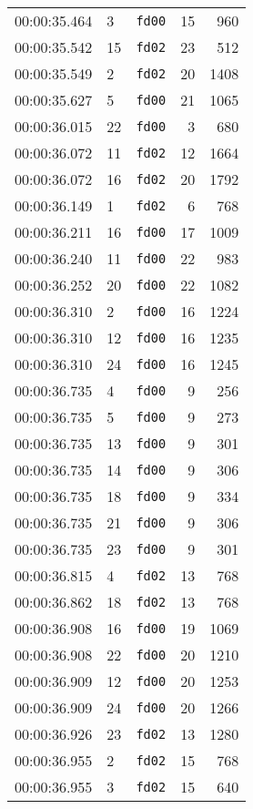 \documentclass{article}
\begin{document}
\begin{longtable}{lllrr}
00:00:35.464 & 3 & \texttt{fd00} & 15 & 960 \\
00:00:35.542 & 15 & \texttt{fd02} & 23 & 512 \\
00:00:35.549 & 2 & \texttt{fd02} & 20 & 1408 \\
00:00:35.627 & 5 & \texttt{fd00} & 21 & 1065 \\
00:00:36.015 & 22 & \texttt{fd00} & 3 & 680 \\
00:00:36.072 & 11 & \texttt{fd02} & 12 & 1664 \\
00:00:36.072 & 16 & \texttt{fd02} & 20 & 1792 \\
00:00:36.149 & 1 & \texttt{fd02} & 6 & 768 \\
00:00:36.211 & 16 & \texttt{fd00} & 17 & 1009 \\
00:00:36.240 & 11 & \texttt{fd00} & 22 & 983 \\
00:00:36.252 & 20 & \texttt{fd00} & 22 & 1082 \\
00:00:36.310 & 2 & \texttt{fd00} & 16 & 1224 \\
00:00:36.310 & 12 & \texttt{fd00} & 16 & 1235 \\
00:00:36.310 & 24 & \texttt{fd00} & 16 & 1245 \\
00:00:36.735 & 4 & \texttt{fd00} & 9 & 256 \\
00:00:36.735 & 5 & \texttt{fd00} & 9 & 273 \\
00:00:36.735 & 13 & \texttt{fd00} & 9 & 301 \\
00:00:36.735 & 14 & \texttt{fd00} & 9 & 306 \\
00:00:36.735 & 18 & \texttt{fd00} & 9 & 334 \\
00:00:36.735 & 21 & \texttt{fd00} & 9 & 306 \\
00:00:36.735 & 23 & \texttt{fd00} & 9 & 301 \\
00:00:36.815 & 4 & \texttt{fd02} & 13 & 768 \\
00:00:36.862 & 18 & \texttt{fd02} & 13 & 768 \\
00:00:36.908 & 16 & \texttt{fd00} & 19 & 1069 \\
00:00:36.908 & 22 & \texttt{fd00} & 20 & 1210 \\
00:00:36.909 & 12 & \texttt{fd00} & 20 & 1253 \\
00:00:36.909 & 24 & \texttt{fd00} & 20 & 1266 \\
00:00:36.926 & 23 & \texttt{fd02} & 13 & 1280 \\
00:00:36.955 & 2 & \texttt{fd02} & 15 & 768 \\
00:00:36.955 & 3 & \texttt{fd02} & 15 & 640 \\

\end{longtable}
\end{document}
